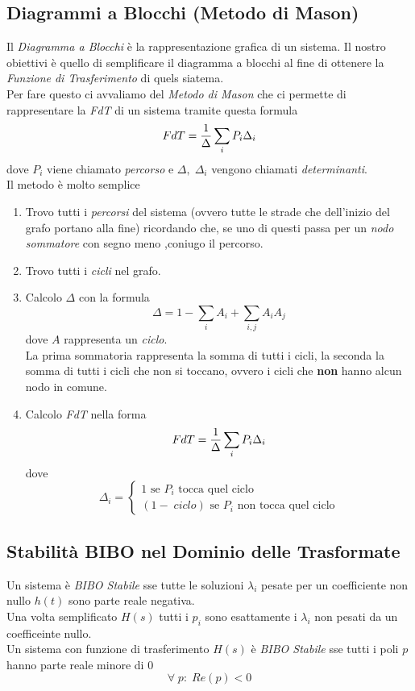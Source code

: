 \documentclass{article}
\begin{document}
		\subsection{Diagrammi a Blocchi (Metodo di Mason)}
			Il \textit{Diagramma a Blocchi} è la rappresentazione grafica di un sistema. Il nostro obiettivi è quello di semplificare il diagramma a blocchi al fine di ottenere la \textit{Funzione di Trasferimento} di quels siatema. \\
			Per fare questo ci avvaliamo del \textit{Metodo di Mason} che ci permette di rappresentare la \textit{FdT} di un sistema tramite questa formula
			\[
				FdT = {{1}\over{\Delta}}\sum_{i} {P_i\Delta_i}
			\]
			dove $ P_i $ viene chiamato \textit{percorso} e $ \Delta,\; \Delta_i $ vengono chiamati \textit{determinanti}. \\
			Il metodo è molto semplice
			\begin{enumerate}
				\item Trovo tutti i \textit{percorsi} del sistema (ovvero tutte le strade che dell'inizio del grafo portano alla fine) ricordando che, se uno di questi passa per un \textit{nodo sommatore} con segno meno ,coniugo il percorso.
				\item Trovo tutti i \textit{cicli} nel grafo.
				\item Calcolo $ \Delta $ con la formula
					  \[
					  	\Delta = 1 - \sum_{i} {A_i} + \sum_{i,j} {A_iA_j}
					  \]
					  dove $ A $ rappresenta un \textit{ciclo}. \\
					  La prima sommatoria rappresenta la somma di tutti i cicli, la seconda la somma di tutti i cicli che non si toccano, ovvero i cicli che \textbf{non} hanno alcun nodo in comune.
				\item Calcolo \textit{FdT} nella forma
					  \[
					  	FdT = {{1}\over{\Delta}}\sum_{i} {P_i\Delta_i}
					  \]
					  dove
					  \[
					  	\Delta_i =
						\begin{cases}
							1\text{ se }P_i\text{ tocca quel ciclo} \\
							(1 -\; ciclo)\text{ se }P_i\text{ non tocca quel ciclo}
						\end{cases}
 					  \]
			\end{enumerate}

		\subsection{Stabilità BIBO nel Dominio delle Trasformate}
			Un sistema è \textit{BIBO Stabile} sse tutte le soluzioni $ \lambda_i $ pesate per un coefficiente non nullo $ h(t) $ sono parte reale negativa. \\
			Una volta semplificato $ H(s) $ tutti i $ p_i $ sono esattamente i $ \lambda_i $ non pesati da un coefficeinte nullo. \\
			Un sistema con funzione di trasferimento $ H(s) $ è \textit{BIBO Stabile} sse tutti i poli $ p $ hanno parte reale minore di 0
			\[
				\forall\; p:\; Re(p) < 0
			\]
\end{document}
